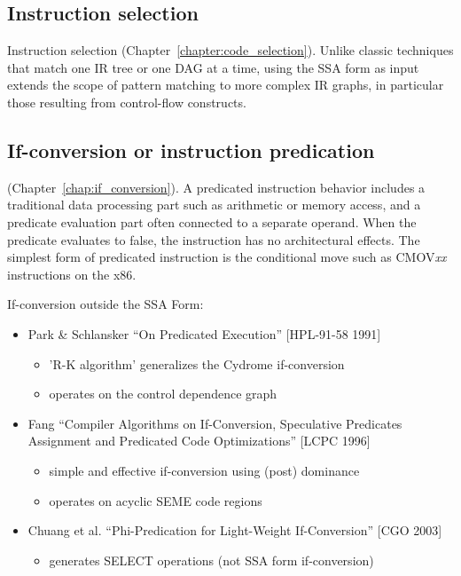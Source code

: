 \subsection{Instruction selection}

Instruction selection (Chapter~\ref{chapter:code_selection}). Unlike
classic techniques that match one IR tree or one DAG at a time, using the SSA
form as input extends the scope of pattern matching to more complex IR graphs,
in particular those resulting from control-flow constructs.

\subsection{If-conversion or instruction predication}

(Chapter~\ref{chap:if_conversion}). A predicated instruction behavior includes a
traditional data processing part such as arithmetic or memory access, and a
predicate evaluation part often connected to a separate operand. When the
predicate evaluates to false, the instruction has no architectural effects. The
simplest form of predicated instruction is the conditional move such as
CMOV\emph{xx} instructions on the x86. 

If-conversion outside the SSA Form:
\begin{itemize}

\item Park \& Schlansker ``On Predicated Execution'' [HPL-91-58 1991]
\begin{itemize}
\item 'R-K algorithm' generalizes the Cydrome if-conversion
\item operates on the control dependence graph
\end{itemize}

\item Fang ``Compiler Algorithms on If-Conversion, Speculative Predicates
Assignment and Predicated Code Optimizations'' [LCPC 1996]
\begin{itemize}
\item simple and effective if-conversion using (post) dominance
\item operates on acyclic SEME code regions
\end{itemize}

\item Chuang et al. ``Phi-Predication for Light-Weight If-Conversion'' [CGO
2003]
\begin{itemize}
\item generates SELECT operations (not SSA form if-conversion)
\end{itemize}

\end{itemize}


